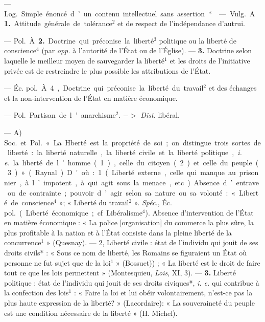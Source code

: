 \begin{itemize}[leftmargin=1cm, label=, itemsep=1pt]
 — \si{Log.} Simple énoncé d’un
contenu intellectuel sans assertion*.

 — \si{Vulg.} A. {\bf 1.} Attitude
générale de tolérance$^2$ et de respect
de l'indépendance d’autrui.

— \si{Pol.} À. {\bf 2.} Doctrine qui préconise la liberté$^3$ politique ou la liberté
de conscience$^4$ (par {\it opp.} à l'autorité
de l'État ou de l'Église). — {\bf 3.} Doctrine selon laquelle le meilleur
moyen de sauvegarder la liberté$^1$ et
les droits de l'initiative privée est
de restreindre le plus possible les
attributions de l’État.

— \si{Éc. pol.} À. 4, Doctrine qui préconise la liberté du travail$^2$ et des
échanges et la non-intervention de
l'État en matière économique.

 — \si{Pol.} Partisan de l’anarchisme$^2$. $->$ {\it {\it Dist.}} libéral.

 — A) \si{Soc.} et \si{Pol.} « La Hberté
est la propriété de soi; on distingue
trois sortes de liberté : la liberté
naturelle, la liberté civile et la
liberté politique, {\it i. e.} la liberté de
l’homme (1), celle du citoyen (2) et
celle du peuple (3) » (Raynal). D'où:
1. (Liberté externe, celle qui manque
au prisonnier, à l’impotent, à qui
agit sous la menace, etc.). Absence
d’entrave ou de contrainte; pouvoir
d’agir selon sa nature ou sa volonté :
« Liberté de conscience$^4$ »; « Liberté
du travail$^2$ ». {\it Spéc.}, \si{Éc. pol.} (Liberté
économique; cf. Libéralisme$^4$).
Absence d'intervention de l'État en
matière économique : « La police
[organisation] du commerce la plus
sûre, la plus profitable à la nation
et à l'État consiste dans la pleine
liberté de la concurrence$^1$ » (Quesnay). — 2, Liberté civile : état de
l'individu qui jouit de ses droits
civils* : « Sous ce nom de liberté,
les Romains se figuraient un État
où personne ne fut sujet que de la
loi$^1$ » (Bossuet)) ; « La liberté est le
droit de faire tout ce que les lois
permettent » (Montesquieu, {\it Lois},
XI, 3). — {\bf 3.} Liberté politique : état de
l'individu qui jouit de ses droits
civiques*, {\it i. e.} qui contribue à la
confection des lois$^1$ : « Faire la loi
et lui obéir volontairement, n'est-ce
pas la plus haute expression de la
liberté? » (Lacordaire): « La souveraineté du peuple est une condition
nécessaire de la liberté » (H. Michel).


\end{itemize}
